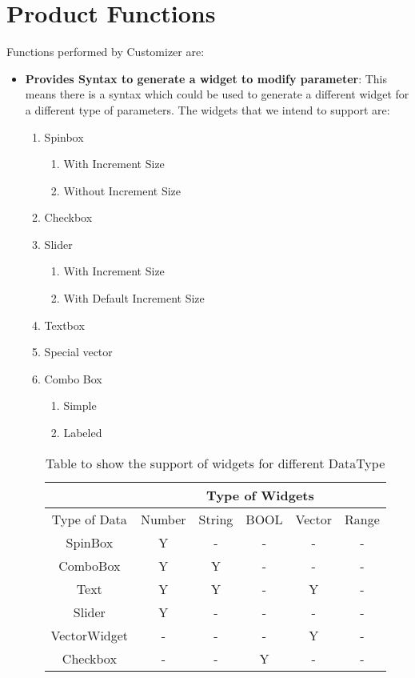 \section{Product Functions}

Functions performed by Customizer are:
\begin{itemize}
    \item {\bf Provides Syntax to generate a widget to modify parameter}: This means there is a syntax which could be used to generate a different widget for a different type of parameters.
    The widgets that we intend to support are:
    \begin{enumerate}
        \item Spinbox
        \begin{enumerate}
            \item With Increment Size
            \item Without Increment Size
        \end{enumerate}
        \item Checkbox
        \item Slider
        \begin{enumerate}
            \item With Increment Size
            \item With Default Increment Size
        \end{enumerate}
        \item Textbox
        \item Special vector
        \item Combo Box
        \begin{enumerate}
            \item Simple
            \item Labeled
        \end{enumerate}
       
        \begin{table}[h]
            \centering
            \begin{tabular}{ |c|c|c|c|c|c| }
                \hline
                & \multicolumn{5}{|c|}{Type of Widgets} \\
                \hline
                Type of Data&    Number&    String&    BOOL &Vector &Range     \\ [0.5ex]
                \hline
                SpinBox&Y&    -&    -&    -&    - \\ \hline
                ComboBox&    Y&    Y&    -&    -&    - \\ \hline
                Text&    Y&    Y&    -&    Y&    - \\ \hline
                Slider&    Y&    -&    -&    -&    - \\ \hline
                VectorWidget&    -&    -&    -&    Y&- \\ \hline
                Checkbox&    -&    -&    Y&    -&    - \\ [1ex]
                \hline
            \end{tabular}
            \caption{Table to show the support of widgets for different DataType}
            \label{table2}
        \end{table}
       

\end{enumerate}
\end{itemize}

